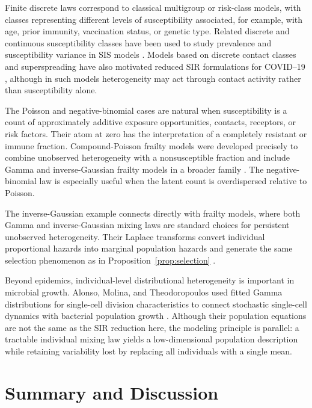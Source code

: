 \documentclass[pdflatex,sn-mathphys-ay]{sn-jnl}
\theoremstyle{thmstyleone}
\theoremstyle{thmstyletwo}
\theoremstyle{thmstylethree}
\begin{document}
Finite discrete laws correspond to classical multigroup or risk-class models,
with classes representing different levels of susceptibility associated, for
example, with age, prior immunity, vaccination status, or genetic type.
Related discrete and continuous susceptibility classes have been used to study
prevalence and susceptibility variance in SIS models
\citep{MargheriEtAl2015}. Models based on discrete contact classes and
superspreading have also motivated reduced SIR formulations for COVID--19
\citep{Szapudi2020}, although in such models heterogeneity may act through
contact activity rather than susceptibility alone.

The Poisson and negative-binomial cases are natural when susceptibility is a
count of approximately additive exposure opportunities, contacts, receptors,
or risk factors. Their atom at zero has the interpretation of a completely resistant or immune fraction. Compound-Poisson frailty models were developed precisely to
combine unobserved heterogeneity with a nonsusceptible fraction and include
Gamma and inverse-Gaussian frailty models in a broader family
\citep{WienkeEtAl2010}. The negative-binomial law is especially useful when the
latent count is overdispersed relative to Poisson.

The inverse-Gaussian example connects directly with frailty models, where both
Gamma and inverse-Gaussian mixing laws are standard choices for persistent
unobserved heterogeneity. Their Laplace transforms convert individual
proportional hazards into marginal population hazards and generate the same
selection phenomenon as in Proposition~\ref{prop:selection}
\citep{Aalen1994,BalanPutter2019}.

Beyond epidemics, individual-level distributional heterogeneity is important
in microbial growth. Alonso, Molina, and Theodoropoulos used fitted Gamma
distributions for single-cell division characteristics to connect stochastic
single-cell dynamics with bacterial population growth
\citep{AlonsoEtAl2014}. Although their population equations are not the same as
the SIR reduction here, the modeling principle is parallel: a tractable
individual mixing law yields a low-dimensional population description while
retaining variability lost by replacing all individuals with a single mean.


\section{Summary and Discussion}\label{sec:discussion}
\end{document}
